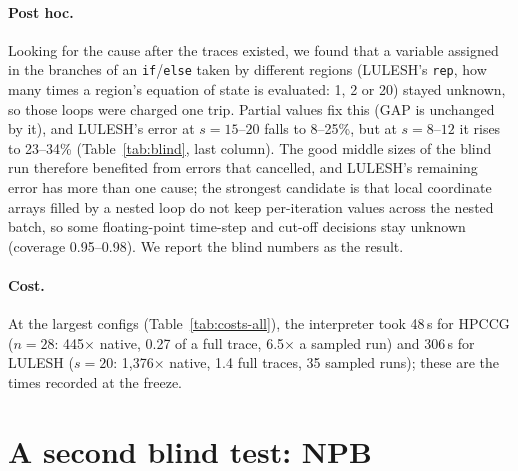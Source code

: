 \documentclass[11pt]{article}
\newcommand{\code}[1]{\texttt{#1}}
\newcommand{\tabref}[1]{Table~\ref{#1}}
\begin{document}
\paragraph{Post hoc.} Looking for the cause after the traces existed, we found that a variable assigned in the
branches of an \code{if}/\code{else} taken by different regions (LULESH's \code{rep}, how many times a region's
equation of state is evaluated: 1, 2 or 20) stayed unknown, so those loops were charged one trip. Partial values fix
this (GAP is unchanged by it), and LULESH's error at $s = 15$--$20$ falls to 8--25\%, but at $s = 8$--$12$ it rises to
23--34\% (\tabref{tab:blind}, last column). The good middle sizes of the blind run therefore benefited from errors that
cancelled, and LULESH's remaining error has more than one cause; the strongest candidate is that local coordinate
arrays filled by a nested loop do not keep per-iteration values across the nested batch, so some floating-point
time-step and cut-off decisions stay unknown (coverage 0.95--0.98). We report the blind numbers as the result.

\paragraph{Cost.} At the largest configs (\tabref{tab:costs-all}), the interpreter took 48\,s for HPCCG ($n = 28$:
445$\times$ native, 0.27 of a full trace, 6.5$\times$ a sampled run) and 306\,s for LULESH ($s = 20$: 1{,}376$\times$
native, 1.4 full traces, 35 sampled runs); these are the times recorded at the freeze.

\clearpage
\section{A second blind test: NPB}
\label{sec:blind2}
\end{document}
